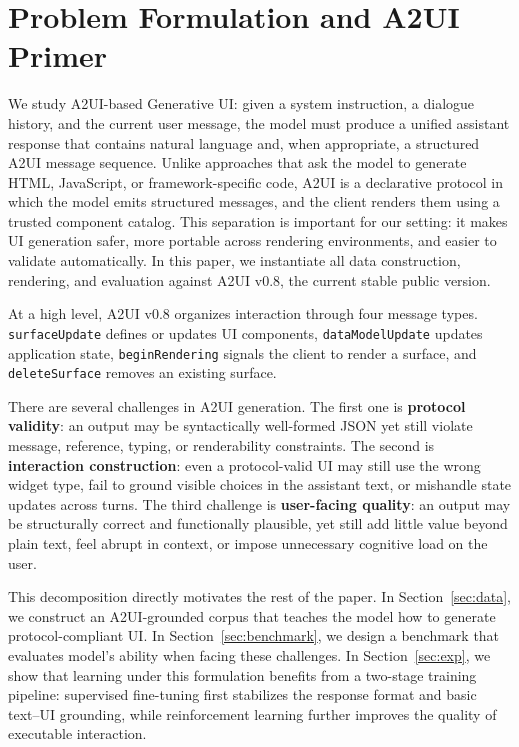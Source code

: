 \documentclass{llmxive}
\begin{document}
\section{Problem Formulation and A2UI Primer}
\label{sec:problem}

We study A2UI-based Generative UI: given a system instruction, a dialogue history, and the current user message, the model must produce a unified assistant response that contains natural language and, when appropriate, a structured A2UI message sequence. Unlike approaches that ask the model to generate HTML, JavaScript, or framework-specific code, A2UI is a declarative protocol in which the model emits structured messages, and the client renders them using a trusted component catalog. This separation is important for our setting: it makes UI generation safer, more portable across rendering environments, and easier to validate automatically. In this paper, we instantiate all data construction, rendering, and evaluation against A2UI v0.8, the current stable public version.

At a high level, A2UI v0.8 organizes interaction through four message types. \texttt{surfaceUpdate} defines or updates UI components, \texttt{dataModelUpdate} updates application state, \texttt{beginRendering} signals the client to render a surface, and \texttt{deleteSurface} removes an existing surface. 

There are several challenges in A2UI generation. The first one is \textbf{protocol validity}: an output may be syntactically well-formed JSON yet still violate message, reference, typing, or renderability constraints. The second is \textbf{interaction construction}: even a protocol-valid UI may still use the wrong widget type, fail to ground visible choices in the assistant text, or mishandle state updates across turns. The third challenge is \textbf{user-facing quality}: an output may be structurally correct and functionally plausible, yet still add little value beyond plain text, feel abrupt in context, or impose unnecessary cognitive load on the user.

This decomposition directly motivates the rest of the paper. In Section~\ref{sec:data}, we construct an A2UI-grounded corpus that teaches the model how to generate protocol-compliant UI. In Section~\ref{sec:benchmark}, we design a benchmark that evaluates model's ability when facing these challenges. In Section~\ref{sec:exp}, we show that learning under this formulation benefits from a two-stage training pipeline: supervised fine-tuning first stabilizes the response format and basic text--UI grounding, while reinforcement learning further improves the quality of executable interaction.
\end{document}

